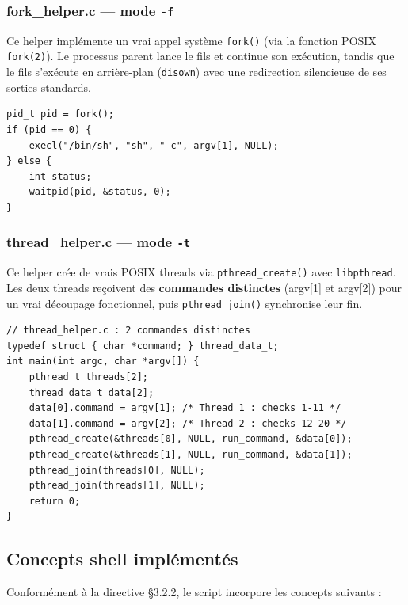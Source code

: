 \documentclass[12pt,a4paper]{article}
\newcommand{\opt}[1]{\texttt{\textcolor{bleuMed}{\textbf{#1}}}}
\newcommand{\cmd}[1]{\texttt{\textcolor{codeText}{#1}}}
\begin{document}
\subsubsection{fork\_helper.c --- mode \opt{-f}}

Ce helper implémente un vrai appel système \cmd{fork()} (via la fonction POSIX \texttt{fork(2)}). Le processus parent lance le fils et continue son exécution, tandis que le fils s'exécute en arrière-plan (\cmd{disown}) avec une redirection silencieuse de ses sorties standards.\\

\begin{lstlisting}[style=c]
pid_t pid = fork();
if (pid == 0) {
    execl("/bin/sh", "sh", "-c", argv[1], NULL);
} else {
    int status;
    waitpid(pid, &status, 0);
}
\end{lstlisting}

\subsubsection{thread\_helper.c --- mode \opt{-t}}

Ce helper crée de vrais POSIX threads via \cmd{pthread\_create()} avec \cmd{libpthread}. Les deux threads reçoivent des \textbf{commandes distinctes} (argv[1] et argv[2]) pour un vrai découpage fonctionnel, puis \cmd{pthread\_join()} synchronise leur fin.

\begin{lstlisting}[style=c]
// thread_helper.c : 2 commandes distinctes
typedef struct { char *command; } thread_data_t;
int main(int argc, char *argv[]) {
    pthread_t threads[2];
    thread_data_t data[2];
    data[0].command = argv[1]; /* Thread 1 : checks 1-11 */
    data[1].command = argv[2]; /* Thread 2 : checks 12-20 */
    pthread_create(&threads[0], NULL, run_command, &data[0]);
    pthread_create(&threads[1], NULL, run_command, &data[1]);
    pthread_join(threads[0], NULL);
    pthread_join(threads[1], NULL);
    return 0;
}
\end{lstlisting}

\subsection{Concepts shell implémentés}

Conformément à la directive §3.2.2, le script incorpore les concepts suivants :
\end{document}
